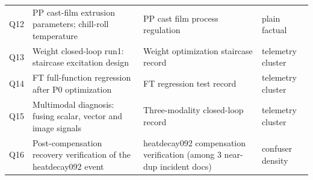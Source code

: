 \begin{table}[!htbp]
\begin{tabular}{lp{5.3cm}p{4.0cm}p{2.8cm}}
Q12 & PP cast-film extrusion parameters; chill-roll temperature & PP cast
film process regulation & plain factual \\
Q13 & Weight closed-loop run1: staircase excitation design & Weight
optimization staircase record & telemetry cluster \\
Q14 & FT full-function regression after P0 optimization & FT regression test
record & telemetry cluster \\
Q15 & Multimodal diagnosis: fusing scalar, vector and image signals &
Three-modality closed-loop record & telemetry cluster \\
Q16 & Post-compensation recovery verification of the heatdecay092 event &
heatdecay092 compensation verification (among 3 near-dup incident docs) &
confuser density \\
\bottomrule
\end{tabular}
\end{table}

